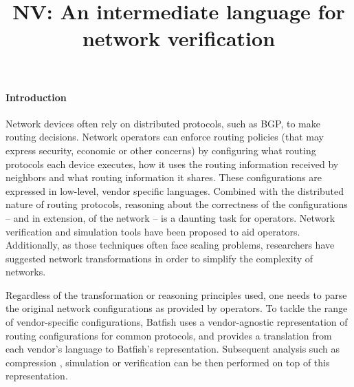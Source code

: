 \documentclass[sigconf,10pt]{acmart}
\begin{document}
\title{NV: An intermediate language for network verification}


\maketitle

%
%
%
%

\paragraph{Introduction} 

Network devices often rely on distributed protocols, such as BGP, to
make routing decisions. Network operators can enforce routing policies
(that may express security, economic or other concerns) by configuring
what routing protocols each device executes, how it uses the routing
information received by neighbors and what routing information it
shares. These configurations are expressed in low-level, vendor
specific languages. Combined with the distributed nature of routing
protocols, reasoning about the correctness of the configurations --
and in extension, of the network -- is a daunting task for operators.
Network verification \cite{minesweeper,arc} and simulation tools
\cite{batfish} have been proposed to aid operators. Additionally, as
those techniques often face scaling problems, researchers have
suggested network transformations \cite{bonsai, origami} in order to
simplify the complexity of networks.

Regardless of the transformation or reasoning principles used, one
needs to parse the original network configurations as provided by
operators. To tackle the range of vendor-specific configurations,
Batfish \cite{batfish} uses a vendor-agnostic representation of
routing configurations for common protocols, and provides a translation from each vendor's
language to Batfish's representation. Subsequent analysis such as
compression \cite{bonsai}, simulation \cite{batfish} or verification
\cite{minesweeper,arc} can be then performed on top of this
representation.
\end{document}
